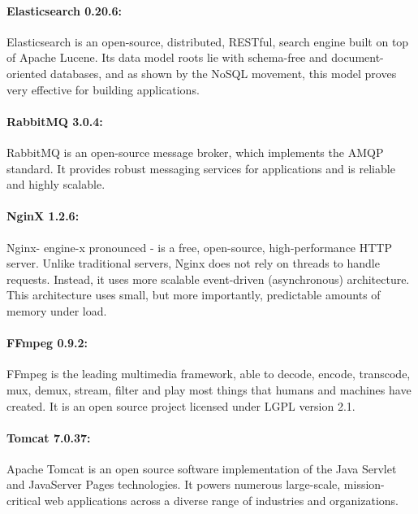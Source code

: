 \paragraph{Elasticsearch 0.20.6:} Elasticsearch is an open-source, distributed, RESTful, search engine built on top of Apache Lucene. Its data model roots lie with schema-free and document-oriented databases, and as shown by the NoSQL movement, this model proves very effective for building applications.

\paragraph{RabbitMQ 3.0.4:} RabbitMQ is an open-source message broker, which implements the AMQP standard. It provides  robust messaging services for applications and is reliable and highly scalable.

\paragraph{NginX 1.2.6:} Nginx- engine-x pronounced - is a free, open-source, high-performance \ac{HTTP} server. Unlike traditional servers, Nginx does not rely on threads to handle requests. Instead, it uses more scalable event-driven (asynchronous) architecture. This architecture uses small, but more importantly, predictable amounts of memory under load.

\paragraph{FFmpeg 0.9.2:} FFmpeg is the leading multimedia framework, able to decode, encode, transcode, mux, demux, stream, filter and play most things that humans and machines have created. It is an open source project licensed under LGPL version 2.1.

\paragraph{Tomcat 7.0.37:} Apache Tomcat is an open source software implementation of the Java Servlet and JavaServer Pages technologies. It powers numerous large-scale, mission-critical web applications across a diverse range of industries and organizations.


